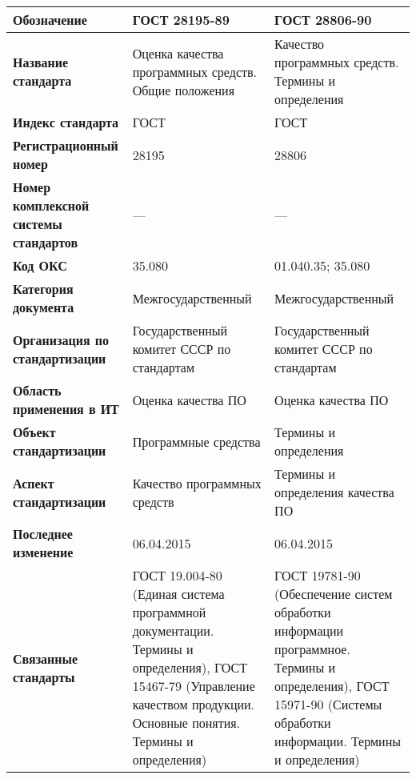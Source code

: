 \begin{table}[h!tp]
	\centering
	\caption{}
	\label{table:interstate}
	\begin{tabular}{|p{10em}|p{11em}|p{11em}|}
		\hline
		\textbf{Обозначение}
			& \textbf{ГОСТ 28195-89} & \textbf{ГОСТ 28806-90} \\ \hline
		\textbf{Название стандарта}
			& Оценка качества программных средств. Общие положения
			& Качество программных средств. Термины и определения \\ \hline
		\textbf{Индекс стандарта} & ГОСТ & ГОСТ \\ \hline
		\textbf{Регистрационный номер} & 28195 & 28806 \\ \hline
		\textbf{Номер комплексной системы стандартов} & --- & --- \\ \hline
		\textbf{Код ОКС} & 35.080 & 01.040.35; 35.080 \\ \hline
		\textbf{Категория документа}
			& Межгосударственный & Межгосударственный \\ \hline
		\textbf{Организация по стандартизации}
			& Государственный комитет СССР по стандартам
			& Государственный комитет СССР по стандартам \\ \hline
		\textbf{Область применения в ИТ}
			& Оценка качества ПО & Оценка качества ПО \\ \hline
		\textbf{Объект стандартизации}
			& Программные средства & Термины и определения \\ \hline
		\textbf{Аспект стандартизации}
			& Качество программных средств
			& Термины и определения качества ПО \\ \hline
		\textbf{Последнее изменение} & 06.04.2015 & 06.04.2015 \\ \hline
		\textbf{Связанные стандарты}
			& ГОСТ 19.004-80 (Единая система программной документации. Термины и определения), ГОСТ 15467-79 (Управление качеством продукции. Основные понятия. Термины и определения)
			& ГОСТ 19781-90 (Обеспечение систем обработки информации программное. Термины и определения), ГОСТ 15971-90 (Системы обработки информации. Термины и определения) \\ \hline
	\end{tabular}
\end{table}

